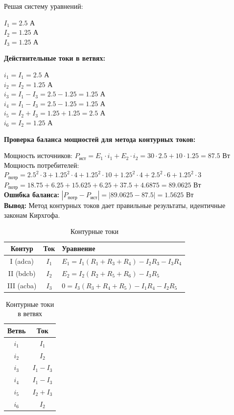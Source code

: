 Решая систему уравнений:
\begin{flushleft}
$I_1 = 2.5$ А \\
$I_2 = 1.25$ А \\
$I_3 = 1.25$ А
\end{flushleft}

\textbf{Действительные токи в ветвях:}
\begin{flushleft}
$i_1 = I_1 = 2.5$ А \\
$i_2 = I_2 = 1.25$ А \\
$i_3 = I_1 - I_3 = 2.5 - 1.25 = 1.25$ А \\
$i_4 = I_1 - I_3 = 2.5 - 1.25 = 1.25$ А \\
$i_5 = I_2 + I_3 = 1.25 + 1.25 = 2.5$ А \\
$i_6 = I_2 = 1.25$ А
\end{flushleft}

\textbf{Проверка баланса мощностей для метода контурных токов:}
\begin{flushleft}
Мощность источников: $P_{ист} = E_1 \cdot i_1 + E_2 \cdot i_2 = 30 \cdot 2.5 + 10 \cdot 1.25 = 87.5$ Вт \\
Мощность потребителей: $P_{потр} = 2.5^2 \cdot 3 + 1.25^2 \cdot 4 + 1.25^2 \cdot 10 + 1.25^2 \cdot 4 + 2.5^2 \cdot 6 + 1.25^2 \cdot 3$ \\
$P_{потр} = 18.75 + 6.25 + 15.625 + 6.25 + 37.5 + 4.6875 = 89.0625$ Вт \\
\textbf{Ошибка баланса:} $|P_{потр} - P_{ист}| = |89.0625 - 87.5| = 1.5625$ Вт \\
\textbf{Вывод:} Метод контурных токов дает правильные результаты, идентичные законам Кирхгофа.
\end{flushleft}

\begin{table}[H]
\centering
\begin{tabular}{|c|c|l|}
\hline
\textbf{Контур} & \textbf{Ток} & \textbf{Уравнение} \\
\hline
I (adca) & $I_1$ & $E_1 = I_1(R_1+R_3+R_4) - I_2R_3 - I_3R_4$ \\
\hline
II (bdcb) & $I_2$ & $E_2 = I_2(R_2+R_5+R_6) - I_3R_5$ \\
\hline
III (acba) & $I_3$ & $0 = I_3(R_3+R_4+R_5) - I_1R_4 - I_2R_5$ \\
\hline
\end{tabular}
\caption{Контурные токи}
\label{tab:loop_current_equations}
\end{table}

\begin{table}[H]
\centering
\begin{tabular}{|c|c|}
\hline
\textbf{Ветвь} & \textbf{Ток} \\
\hline
$i_1$ & $I_1$ \\
\hline
$i_2$ & $I_2$ \\
\hline
$i_3$ & $I_1 - I_3$ \\
\hline
$i_4$ & $I_1 - I_3$ \\
\hline
$i_5$ & $I_2 + I_3$ \\
\hline
$i_6$ & $I_2$ \\
\hline
\end{tabular}
\caption{Контурные токи в ветвях}
\label{tab:loop_to_branch_currents}
\end{table}

